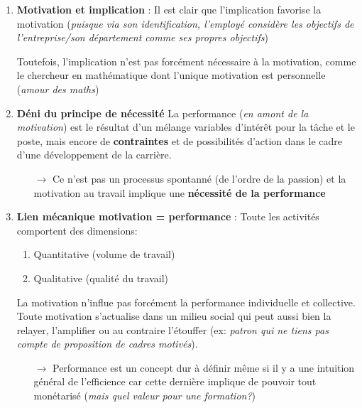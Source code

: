 \documentclass[11pt]{article} %
\begin{document}
\begin{enumerate}
 \item \textbf{Motivation et implication} :
     Il est clair que l'implication favorise la motivation
     (\textit{puisque via son identification, l'employé considère les
     objectifs de l'entreprise/son département comme ses propres
     objectifs})
 
     Toutefois, l'implication n'est pas forcément nécessaire à la
     motivation, comme le chercheur en mathématique dont l'unique
     motivation est personnelle (\textit{amour des maths})
 
 \item \textbf{Déni du principe de nécessité}
     La performance (\textit{en amont de la motivation}) est
     le résultat d'un mélange variables d'intérêt pour la
     tâche et le poste, mais encore de \textbf{contraintes} et de
     possibilités d'action dans le cadre d'une développement de la
     carrière.
 
     \begin{itemize}
         \item[$\to$] Ce n'est pas un processus spontanné (de l'ordre
             de la passion) et la motivation au travail implique une
             \textbf{nécessité de la performance}
     \end{itemize}
 
 \item \textbf{Lien mécanique motivation = performance} :
 	Toute les activités comportent des dimensions:
 	\begin{enumerate}
 		\item Quantitative (volume de travail)
 		\item Qualitative (qualité du travail)
 	\end{enumerate}
 
     La motivation n'influe pas forcément la performance individuelle et
     collective. Toute motivation s'actualise dans un milieu social qui
     peut aussi bien la relayer, l'amplifier ou au contraire l'étouffer
     (ex: \textit{patron qui ne tiens pas compte de proposition de cadres
     motivés}).
 
     \begin{itemize}
         \item[$\to$] Performance est un concept dur à définir
             même si il y a une intuition général de l'efficience car
             cette dernière implique de pouvoir tout monétarisé
             (\textit{mais quel valeur pour une formation?})
     \end{itemize}
             
\end{enumerate}
\end{document}
